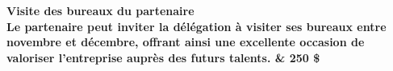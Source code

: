\bf Visite des bureaux du partenaire\\
Le partenaire peut inviter la délégation à visiter ses bureaux entre novembre et décembre, offrant ainsi une excellente occasion de valoriser l'entreprise auprès des futurs talents.
& 250 \$\\
\hline